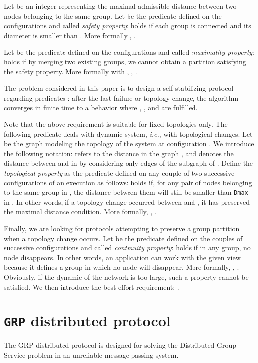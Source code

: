 \documentclass[11pt,english]{article}
\begin{document}
Let  be an integer representing the maximal admissible distance between two nodes belonging to
the same group.  Let  be the predicate defined on the configurations and called \emph{safety
property}:  holds if each group is connected and its diameter is
smaller than .
More formally , .

Let  be the predicate defined on the configurations and called
\emph{maximality property}:  holds if by merging two existing groups,
we cannot obtain a partition satisfying the safety property. More formally
 with , , .

The problem considered in this paper is to design a self-stabilizing protocol
regarding predicates : after the last failure
or topology change, the algorithm converges in finite time to a behavior where
, , and  are fulfilled.

Note that the above requirement is suitable for fixed topologies only.  The
following predicate deals with dynamic system, {\it i.e.}, with topological
changes.
Let  be the graph modeling the topology of the system at
configuration . We introduce the following notation:  refers to the
distance in the graph , and  denotes the
distance between  and  in  by considering only edges of the
subgraph  of .
Define the {\em topological property} as the predicate  defined on any
couple of two successive configurations  of an execution  as
follows:  holds if, for any pair of nodes belonging to the
same group in , the distance between them will still be smaller than
\texttt{Dmax} in . In other words, if a topology change occurred
between  and , it has preserved the maximal distance condition.
More formally, , .

Finally, we are looking for protocols attempting to preserve a group partition when a topology change occurs. 
Let  be the predicate defined on the couples of successive configurations
and called \emph{continuity property}:  holds if in any
group, no node disappears. In other words, an application can work with the
given view because it defines a group in which no node will disappear. More
formally, , .
Obviously, if the dynamic of the network is too large, such a property cannot be
satisfied.  We then introduce the best effort requirement: .




\section{\texttt{GRP} distributed protocol}\label{s:algo}

The GRP distributed protocol is designed for solving the Distributed Group
Service problem in an unreliable message passing system.
\end{document}
